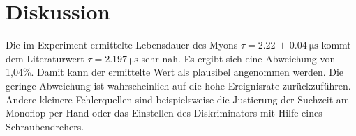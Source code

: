 \section{Diskussion}
Die im Experiment ermittelte Lebensdauer des Myons $\tau = \SI{2.22(4)}{\micro\second}$
kommt dem Literaturwert $\tau = \SI{2.197}{\micro\second}$ \cite{lebensdauer} sehr nah.
Es ergibt sich eine Abweichung von 1,04\%.
Damit kann der ermittelte Wert als plausibel angenommen werden.
Die geringe Abweichung ist wahrscheinlich auf die hohe Ereignisrate zurückzuführen.
Andere kleinere Fehlerquellen sind beispielsweise die Justierung der Suchzeit am Monoflop per Hand oder
das Einstellen des Diskriminators mit Hilfe eines Schraubendrehers. 

\nocite{*}
\printbibliography{}

%
